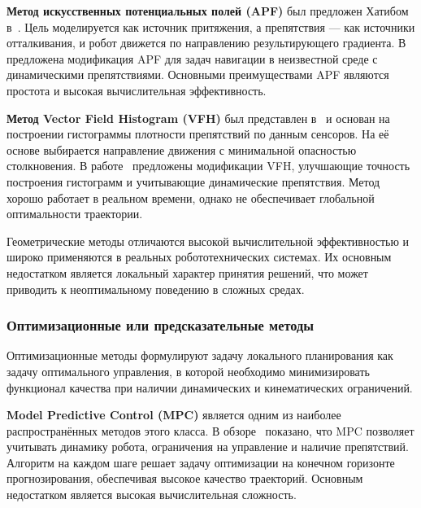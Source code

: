\documentclass[a4paper,12pt]{extarticle}
\begin{document}
    \textbf{Метод искусственных потенциальных полей (APF)} был предложен Хатибом в~\cite{apf_orig}.
    Цель моделируется как источник притяжения, а препятствия — как источники отталкивания,
    и робот движется по направлению результирующего градиента.
    В~\cite{apf_new} предложена модификация APF для задач навигации в неизвестной среде с динамическими препятствиями.
    Основными преимуществами APF являются простота и высокая вычислительная эффективность.

    \textbf{Метод Vector Field Histogram (VFH)} был представлен в~\cite{vfh_orig} и
    основан на построении гистограммы плотности препятствий по данным сенсоров.
    На её основе выбирается направление движения с минимальной опасностью столкновения.
    В работе~\cite{vfh_new} предложены модификации VFH,
    улучшающие точность построения гистограмм и учитывающие динамические препятствия.
    Метод хорошо работает в реальном времени, однако не обеспечивает глобальной оптимальности траектории.

    Геометрические методы отличаются высокой вычислительной эффективностью и
    широко применяются в реальных робототехнических системах.
    Их основным недостатком является локальный характер принятия решений,
    что может приводить к неоптимальному поведению в сложных средах.

    \subsubsection{Оптимизационные или предсказательные методы}

    Оптимизационные методы формулируют задачу локального планирования как задачу оптимального управления,
    в которой необходимо минимизировать функционал качества при наличии динамических и кинематических ограничений.

    \textbf{Model Predictive Control (MPC)} является одним из наиболее распространённых методов этого класса.
    В обзоре~\cite{mpc} показано, что MPC позволяет учитывать динамику робота,
    ограничения на управление и наличие препятствий.
    Алгоритм на каждом шаге решает задачу оптимизации на конечном горизонте прогнозирования,
    обеспечивая высокое качество траекторий.
    Основным недостатком является высокая вычислительная сложность.
\end{document}
